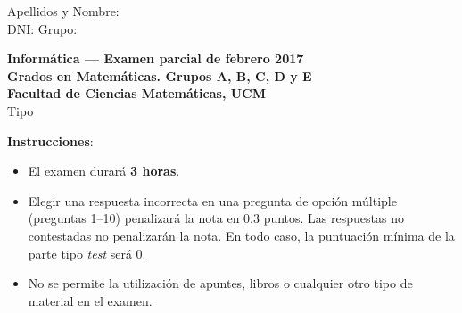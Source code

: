 \documentclass[10pt]{examdesign}
\begin{document}
\begin{examtop}
    \noindent Apellidos y Nombre:\dotfill \\
    \noindent DNI: \dotfill Grupo: \dotfill \\
  \begin{center}
    \textbf{Informática --- Examen parcial de febrero 2017} \\
    \textbf{Grados en Matemáticas. Grupos A, B, C, D y E} \\
    \textbf{Facultad de Ciencias Matemáticas, UCM} \\
    Tipo \\
  \end{center}
\end{examtop}

\begin{exampreface}
\textbf{Instrucciones}:~\\
\begin{itemize}
\item El examen durará \textbf{3 horas}. 
\item Elegir una respuesta incorrecta en una pregunta de opción múltiple (preguntas 1--10) penalizará la nota en 0.3 puntos. Las respuestas no contestadas no penalizarán la nota. En todo caso, la puntuación mínima de la parte tipo \textit{test} será 0. 
\item No se permite la utilización de apuntes, libros o cualquier otro tipo de material en el examen. 

\end{itemize}



\end{exampreface}
\end{document}
